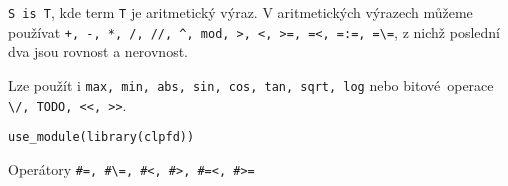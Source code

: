 \documentclass[12pt]{article}					%
\begin{document}
\begin{definice}[Aritmetika]
	\verb|S is T|, kde term \verb|T| je aritmetický výraz. V aritmetických výrazech můžeme používat \verb|+, -, *, /, //, ^, mod, >, <, >=, =<, =:=, =\=|, z nichž poslední dva jsou rovnost a nerovnost.

	Lze použít i \verb|max, min, abs, sin, cos, tan, sqrt, log| nebo bitové operace \verb|\/, TODO, <<, >>|.
\end{definice}

\begin{poznamka}
	\verb|use_module(library(clpfd))|

	Operátory \verb|#=, #\=, #<, #>, #=<, #>=|
\end{poznamka}
	
\end{document}
